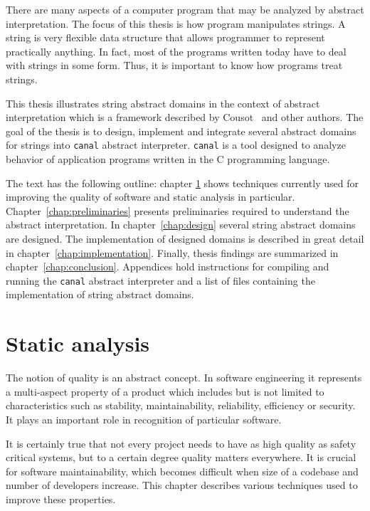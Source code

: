 \documentclass[12pt,final,oneside]{fithesis2}
\theoremstyle{definition}
\begin{document}
There are many aspects of a computer program that may be analyzed by
abstract interpretation. The focus of this thesis is how program manipulates
strings. A string is very flexible data structure that allows programmer
to represent practically anything. In fact, most of the programs written
today have to deal with strings in some form. Thus, it is important to know
how programs treat strings.

This thesis illustrates string abstract domains in the context of abstract
interpretation which is a framework described by Cousot~\cite{CousotCousot77-1}
\cite{Cousot00-1} \cite{CousotCousot92-4} \cite{CousotCousot99-1} and other
authors. The goal of the thesis is to design, implement and integrate several
abstract domains for strings into \texttt{canal} abstract interpreter.
\texttt{canal} is a tool designed to analyze behavior of application programs
written in the C programming language.

The text has the following outline: chapter \ref{chap:staticanalysis} shows
techniques currently used for improving the quality of software and static
analysis in particular. Chapter~\ref{chap:preliminaries}
presents preliminaries required to understand the abstract interpretation.
In chapter~\ref{chap:design} several string abstract domains are designed.
The implementation of designed domains is described in great detail in
chapter~\ref{chap:implementation}. Finally, thesis findings are summarized
in chapter~\ref{chap:conclusion}. Appendices hold
instructions for compiling and running the \texttt{canal} abstract
interpreter and a list of files containing the implementation of string
abstract domains.


\chapter{Static analysis}
\label{chap:staticanalysis}

The notion of quality is an abstract concept. In software engineering it
represents a multi-aspect property of a product which includes but is not
limited to characteristics such as stability, maintainability, reliability,
efficiency or security. It plays an important role in recognition of
particular software.

It is certainly true that not every project needs to have as high quality as
safety critical systems, but to a certain degree quality matters
everywhere. It is crucial for software maintainability, which becomes
difficult when size of a codebase and number of developers
increase. This chapter describes various techniques used to
improve these properties.
\end{document}
